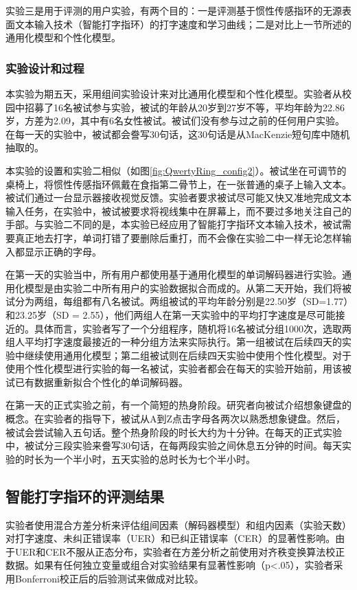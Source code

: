 实验三是用于评测的用户实验，有两个目的：一是评测基于惯性传感指环的无源表面文本输入技术（智能打字指环）的打字速度和学习曲线；二是对比上一节所述的通用化模型和个性化模型。

\subsubsection{实验设计和过程}

本实验为期五天，采用组间实验设计来对比通用化模型和个性化模型。实验者从校园中招募了16名被试参与实验，被试的年龄从20岁到27岁不等，平均年龄为22.86岁，方差为2.09，其中有6名女性被试。被试们没有参与过之前的任何用户实验。在每一天的实验中，被试都会誊写30句话，这30句话是从MacKenzie短句库\cite{mackenzie2003phrase}中随机抽取的。

本实验的设置和实验二相似（如图\ref{fig:QwertyRing_config2}）。被试坐在可调节的桌椅上，将惯性传感指环佩戴在食指第二骨节上，在一张普通的桌子上输入文本。被试们通过一台显示器接收视觉反馈。实验者要求被试尽可能又快又准地完成文本输入任务，在实验中，被试被要求将视线集中在屏幕上，而不要过多地关注自己的手部。与实验二不同的是，本实验已经应用了智能打字指环文本输入技术，被试需要真正地去打字，单词打错了要删除后重打，而不会像在实验二中一样无论怎样输入都显示正确的字母。

在第一天的实验当中，所有用户都使用基于通用化模型的单词解码器进行实验。通用化模型是由实验二中所有用户的实验数据拟合而成的。从第二天开始，我们将被试分为两组，每组都有八名被试。两组被试的平均年龄分别是22.50岁（SD=1.77）和23.25岁（SD = 2.55），他们两组人在第一天实验中的平均打字速度是尽可能接近的。具体而言，实验者写了一个分组程序，随机将16名被试分组1000次，选取两组人平均打字速度最接近的一种分组方法来实际执行。第一组被试在后续四天的实验中继续使用通用化模型；第二组被试则在后续四天实验中使用个性化模型。对于使用个性化模型进行实验的每一名被试，实验者都会在每天的实验开始前，用该被试已有数据重新拟合个性化的单词解码器。

在第一天的正式实验之前，有一个简短的热身阶段。研究者向被试介绍想象键盘的概念。在实验者的指导下，被试从A到Z点击字母各两次以熟悉想象键盘。然后，被试会尝试输入五句话。整个热身阶段的时长大约为十分钟。在每天的正式实验中，被试分三段实验来誊写30句话，在每两段实验之间休息五分钟的时间。每天实验的时长为一个半小时，五天实验的总时长为七个半小时。

\subsection{智能打字指环的评测结果}

实验者使用混合方差分析来评估组间因素（解码器模型）和组内因素（实验天数）对打字速度、未纠正错误率（UER）和已纠正错误率（CER）的显著性影响。由于UER和CER不服从正态分布，实验者在方差分析之前使用对齐秩变换算法\cite{2011-Aligned}校正数据。如果有任何独立变量或组合对实验结果有显著性影响（p<.05），实验者采用Bonferroni校正后的后验测试来做成对比较。

